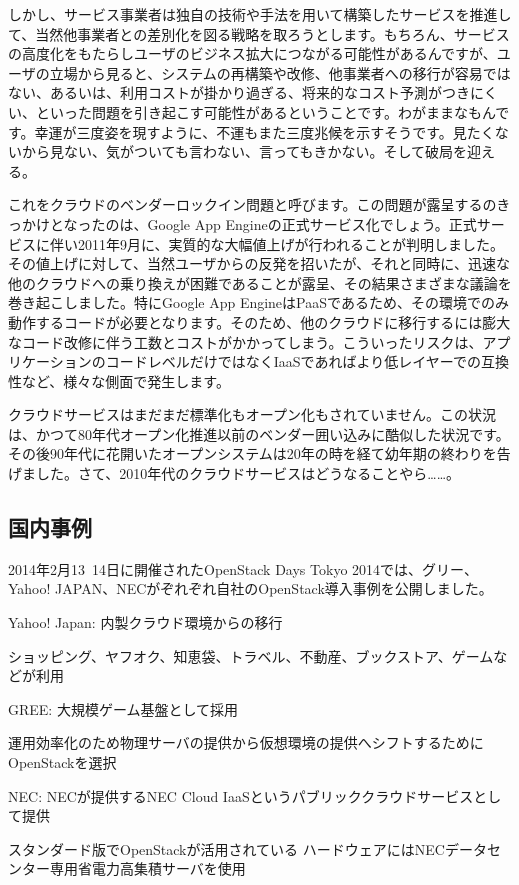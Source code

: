 \documentclass[9pt,b5paper,tombo,openany,dvipdfmx]{jsbook}
\begin{document}
しかし、サービス事業者は独自の技術や手法を用いて構築したサービスを推進して、当然他事業者との差別化を図る戦略を取ろうとします。もちろん、サービスの高度化をもたらしユーザのビジネス拡大につながる可能性があるんですが、ユーザの立場から見ると、システムの再構築や改修、他事業者への移行が容易ではない、あるいは、利用コストが掛かり過ぎる、将来的なコスト予測がつきにくい、といった問題を引き起こす可能性があるということです。わがままなもんです。幸運が三度姿を現すように、不運もまた三度兆候を示すそうです。見たくないから見ない、気がついても言わない、言ってもきかない。そして破局を迎える。

これをクラウドのベンダーロックイン問題と呼びます。この問題が露呈するのきっかけとなったのは、Google App Engineの正式サービス化でしょう。正式サービスに伴い2011年9月に、実質的な大幅値上げが行われることが判明しました。その値上げに対して、当然ユーザからの反発を招いたが、それと同時に、迅速な他のクラウドへの乗り換えが困難であることが露呈、その結果さまざまな議論を巻き起こしました。特にGoogle App EngineはPaaSであるため、その環境でのみ動作するコードが必要となります。そのため、他のクラウドに移行するには膨大なコード改修に伴う工数とコストがかかってしまう。こういったリスクは、アプリケーションのコードレベルだけではなくIaaSであればより低レイヤーでの互換性など、様々な側面で発生します。

クラウドサービスはまだまだ標準化もオープン化もされていません。この状況は、かつて80年代オープン化推進以前のベンダー囲い込みに酷似した状況です。その後90年代に花開いたオープンシステムは20年の時を経て幼年期の終わりを告げました。さて、2010年代のクラウドサービスはどうなることやら……。

\subsection{国内事例}

2014年2月13~14日に開催されたOpenStack Days Tokyo 2014では、グリー、Yahoo! JAPAN、NECがぞれぞれ自社のOpenStack導入事例を公開しました。

Yahoo! Japan: 内製クラウド環境からの移行

ショッピング、ヤフオク、知恵袋、トラベル、不動産、ブックストア、ゲームなどが利用

GREE: 大規模ゲーム基盤として採用

運用効率化のため物理サーバの提供から仮想環境の提供へシフトするためにOpenStackを選択

NEC: NECが提供するNEC Cloud IaaSというパブリッククラウドサービスとして提供

スタンダード版でOpenStackが活用されている
ハードウェアにはNECデータセンター専用省電力高集積サーバを使用
\end{document}
